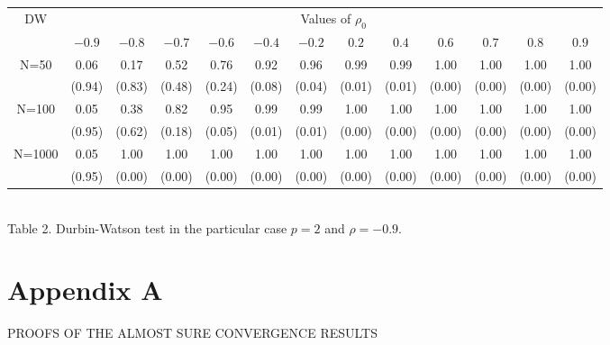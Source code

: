 \documentclass[article,12pt]{amsart}
\numberwithin{equation}{section}
\theoremstyle{plain}
\begin{document}
\vspace{1cm}

\begin{center}
\tiny
\begin{tabular}{|c|c|c|c|c|c|c|c|c|c|c|c|c|}
\hline
\multirow{2}{*}{DW} & \multicolumn{12}{c|}{Values of $\rho_0$} \\
\cline{2-13}
& $-0.9$ & $-0.8$ & $-0.7$ & $-0.6$ & $-0.4$ & $-0.2$ & $0.2$ & $0.4$ & $0.6$ & $0.7$ & $0.8$ & $0.9$  \\
\hline
\multirow{2}{*}{N=50} & 0.06 & 0.17 & 0.52 & 0.76 & 0.92 & 0.96 & 0.99 & 0.99 & 1.00 & 1.00 & 1.00 & 1.00 \\
 & (0.94) & (0.83) & (0.48) & (0.24) & (0.08) & (0.04) & (0.01) & (0.01) & (0.00) & (0.00) & (0.00) & (0.00) \\
\hline
\multirow{2}{*}{N=100} & 0.05 & 0.38 & 0.82 & 0.95 & 0.99 & 0.99 & 1.00 & 1.00 & 1.00 & 1.00 &1.00 & 1.00 \\
 & (0.95) & (0.62) & (0.18) & (0.05) & (0.01) & (0.01) & (0.00) & (0.00) &  (0.00) & (0.00) &  (0.00) & (0.00) \\
\hline
\multirow{2}{*}{N=1000} & 0.05 & 1.00 & 1.00 & 1.00 & 1.00 & 1.00 & 1.00 & 1.00 & 1.00 & 1.00 &1.00 & 1.00 \\
 & (0.95) & (0.00) & (0.00) & (0.00) & (0.00) & (0.00) & (0.00) & (0.00) &  (0.00) & (0.00) &  (0.00) & (0.00) \\
\hline
\end{tabular}\\
\vspace{0.5cm}
\normalsize
Table 2. Durbin-Watson test in the particular case $p=2$ and $\rho=-0.9$.
\end{center}

\section*{Appendix A}

\begin{center}
{\small PROOFS OF THE ALMOST SURE CONVERGENCE RESULTS}
\end{center}
\end{document}
